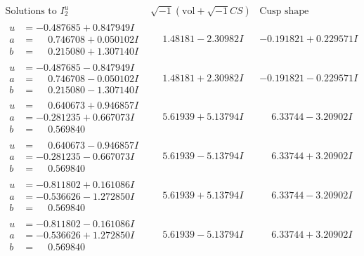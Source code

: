 \documentclass[1p]{elsarticle_modified}
\theoremstyle{definition}
\newcommand{\I}{\sqrt{-1}}
\begin{document}
$$\begin{array}{c|c|c}  
\text{Solutions to }I^u_{2}& \I (\text{vol} + \sqrt{-1}CS) & \text{Cusp shape}\\
 \hline 
\begin{aligned}
u &= -0.487685 + 0.847949 I \\
a &= \phantom{-}0.746708 + 0.050102 I \\
b &= \phantom{-}0.215080 + 1.307140 I\end{aligned}
 & \phantom{-}1.48181 - 2.30982 I & -0.191821 + 0.229571 I \\ \hline\begin{aligned}
u &= -0.487685 - 0.847949 I \\
a &= \phantom{-}0.746708 - 0.050102 I \\
b &= \phantom{-}0.215080 - 1.307140 I\end{aligned}
 & \phantom{-}1.48181 + 2.30982 I & -0.191821 - 0.229571 I \\ \hline\begin{aligned}
u &= \phantom{-}0.640673 + 0.946857 I \\
a &= -0.281235 + 0.667073 I \\
b &= \phantom{-}0.569840\phantom{ +0.000000I}\end{aligned}
 & \phantom{-}5.61939 + 5.13794 I & \phantom{-}6.33744 - 3.20902 I \\ \hline\begin{aligned}
u &= \phantom{-}0.640673 - 0.946857 I \\
a &= -0.281235 - 0.667073 I \\
b &= \phantom{-}0.569840\phantom{ +0.000000I}\end{aligned}
 & \phantom{-}5.61939 - 5.13794 I & \phantom{-}6.33744 + 3.20902 I \\ \hline\begin{aligned}
u &= -0.811802 + 0.161086 I \\
a &= -0.536626 - 1.272850 I \\
b &= \phantom{-}0.569840\phantom{ +0.000000I}\end{aligned}
 & \phantom{-}5.61939 + 5.13794 I & \phantom{-}6.33744 - 3.20902 I \\ \hline\begin{aligned}
u &= -0.811802 - 0.161086 I \\
a &= -0.536626 + 1.272850 I \\
b &= \phantom{-}0.569840\phantom{ +0.000000I}\end{aligned}
 & \phantom{-}5.61939 - 5.13794 I & \phantom{-}6.33744 + 3.20902 I \\ \hline\begin{aligned}

\end{aligned}
\end{array}$$
\end{document}
